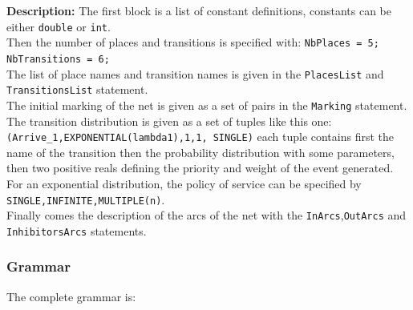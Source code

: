 \documentclass{article}
\begin{document}
{\bf Description:}
The first block is a list of constant definitions, constants can be
either \verb|double| or \verb|int|.\\
Then the number of places and transitions is specified with:
\verb|NbPlaces = 5; NbTransitions = 6;|\\
The list of place names and transition names is given in the
\verb|PlacesList| and \verb|TransitionsList| statement.\\
The initial marking of the net is given as a set of pairs
in the \verb|Marking| statement.\\
The transition distribution is given as a set of tuples like
this one:\\ \verb|(Arrive_1,EXPONENTIAL(lambda1),1,1, SINGLE)|
each tuple contains first the name of the transition then
the probability distribution with some parameters, then two positive
reals defining the priority and weight of the event generated.
For an exponential distribution,  the policy of service can be specified
by \verb|SINGLE,INFINITE,MULTIPLE(n)|.\\
Finally comes the description of the arcs of the net with the 
\verb|InArcs|,\verb|OutArcs| and \verb|InhibitorsArcs| statements.


\subsubsection{Grammar}
The complete grammar is:
\end{document}

